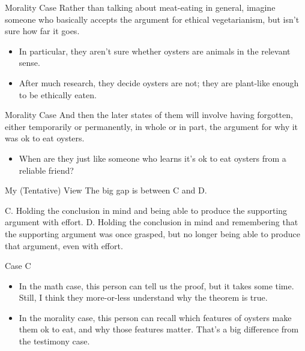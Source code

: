 \documentclass[
  17pt,
  letterpaper,
  ignorenonframetext,
  aspectratio=169,
  handout]{beamer}
\providecommand{\tightlist}{%
  \setlength{\itemsep}{0pt}\setlength{\parskip}{0pt}}\usepackage{longtable,booktabs,array}
\begin{document}
\begin{frame}{Morality Case}
\protect\hypertarget{morality-case}{}
Rather than talking about meat-eating in general, imagine someone who
basically accepts the argument for ethical vegetarianism, but isn't sure
how far it goes.

\begin{itemize}[<+->]
\tightlist
\item
  In particular, they aren't sure whether oysters are animals in the
  relevant sense.
\item
  After much research, they decide oysters are not; they are plant-like
  enough to be ethically eaten.
\end{itemize}
\end{frame}

\begin{frame}{Morality Case}
\protect\hypertarget{morality-case-1}{}
And then the later states of them will involve having forgotten, either
temporarily or permanently, in whole or in part, the argument for why it
was ok to eat oysters.

\begin{itemize}[<+->]
\tightlist
\item
  When are they just like someone who learns it's ok to eat oysters from
  a reliable friend?
\end{itemize}
\end{frame}

\begin{frame}{My (Tentative) View}
\protect\hypertarget{my-tentative-view}{}
The big gap is between C and D.

C. Holding the conclusion in mind and being able to produce the
supporting argument with effort. D. Holding the conclusion in mind and
remembering that the supporting argument was once grasped, but no longer
being able to produce that argument, even with effort.
\end{frame}

\begin{frame}{Case C}
\protect\hypertarget{case-c}{}
\begin{itemize}[<+->]
\tightlist
\item
  In the math case, this person can tell us the proof, but it takes some
  time. Still, I think they more-or-less understand why the theorem is
  true.
\item
  In the morality case, this person can recall which features of oysters
  make them ok to eat, and why those features matter. That's a big
  difference from the testimony case.
\end{itemize}
\end{frame}
\end{document}
